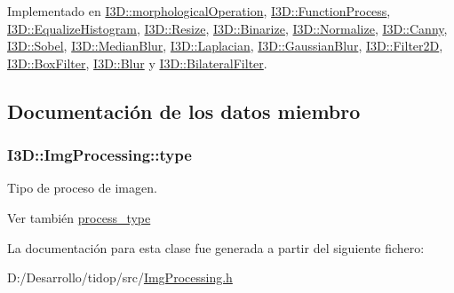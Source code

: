 Implementado en \hyperlink{class_i3_d_1_1morphological_operation_aafa533c5999bed3e9d4680a6434cb43e}{I3\+D\+::morphological\+Operation}, \hyperlink{class_i3_d_1_1_function_process_aa321eb93219271fa3f841538b61133c3}{I3\+D\+::\+Function\+Process}, \hyperlink{class_i3_d_1_1_equalize_histogram_ac748887f28d189287a120b5c6b0977a2}{I3\+D\+::\+Equalize\+Histogram}, \hyperlink{class_i3_d_1_1_resize_a683bd71d9e24c64416dc68231728a73e}{I3\+D\+::\+Resize}, \hyperlink{class_i3_d_1_1_binarize_a2630da33f5cc1c9fe80c991ffd84f613}{I3\+D\+::\+Binarize}, \hyperlink{class_i3_d_1_1_normalize_a14506e377bd5da73c37ce960c2fdf07e}{I3\+D\+::\+Normalize}, \hyperlink{class_i3_d_1_1_canny_a5337ec2dd0c95fe7c9d05444ed8f6425}{I3\+D\+::\+Canny}, \hyperlink{class_i3_d_1_1_sobel_a902c7392196e514597820fbe13a2a634}{I3\+D\+::\+Sobel}, \hyperlink{class_i3_d_1_1_median_blur_aae49eae3c8ceda4ba3a2c485d2a64b4d}{I3\+D\+::\+Median\+Blur}, \hyperlink{class_i3_d_1_1_laplacian_a7e14ea57d17b73a74058083a809fa5c3}{I3\+D\+::\+Laplacian}, \hyperlink{class_i3_d_1_1_gaussian_blur_a19812cea51167dd35e8a85d3178061d5}{I3\+D\+::\+Gaussian\+Blur}, \hyperlink{class_i3_d_1_1_filter2_d_a46f44465658be004e62d7e72cc40cb84}{I3\+D\+::\+Filter2D}, \hyperlink{class_i3_d_1_1_box_filter_aaea2d395620162626a7b16b85ae44c42}{I3\+D\+::\+Box\+Filter}, \hyperlink{class_i3_d_1_1_blur_a9bc99ea12ce16294f415f67ce467a81b}{I3\+D\+::\+Blur} y \hyperlink{class_i3_d_1_1_bilateral_filter_a4b606ce8517fbd44dd1734e1a54bab10}{I3\+D\+::\+Bilateral\+Filter}.



\subsection{Documentación de los datos miembro}
\subsubsection[{\texorpdfstring{type}{type}}]{ I3\+D\+::\+Img\+Processing\+::type}\hypertarget{class_i3_d_1_1_img_processing_af87bd3404d91bca669b04af1f45cbff0}{}\label{class_i3_d_1_1_img_processing_af87bd3404d91bca669b04af1f45cbff0}


Tipo de proceso de imagen. 

\begin{DoxySeeAlso}{Ver también}
\hyperlink{group___img_proc_gaa7be5aaaa0e9ec5885c5bd72f41dad47}{process\+\_\+type} 
\end{DoxySeeAlso}


La documentación para esta clase fue generada a partir del siguiente fichero\+:\begin{DoxyCompactItemize}
\item 
D\+:/\+Desarrollo/tidop/src/\hyperlink{_img_processing_8h}{Img\+Processing.\+h}\end{DoxyCompactItemize}
